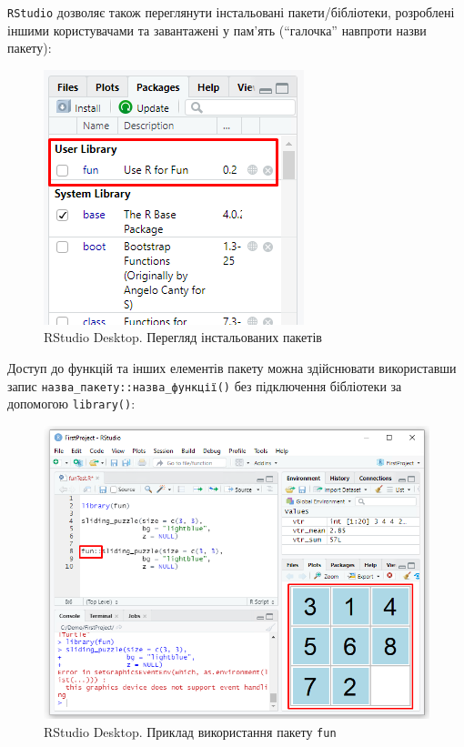 \documentclass[
]{book}
\begin{document}
\texttt{RStudio} дозволяє також переглянути інстальовані пакети/бібліотеки, розроблені іншими користувачами та завантажені у пам'ять (``галочка'' навпроти назви пакету):

\begin{figure}
\centering
\includegraphics{images/chapter1/packages_3.png}
\caption{\label{fig:unnamed-chunk-33}RStudio Desktop. Перегляд інстальованих пакетів}
\end{figure}

Доступ до функцій та інших елементів пакету можна здійснювати використавши запис \texttt{назва\_пакету::назва\_функції()} без підключення бібліотеки за допомогою \texttt{library()}:

\begin{figure}
\centering
\includegraphics{images/chapter1/packages_4.png}
\caption{\label{fig:unnamed-chunk-34}RStudio Desktop. Приклад використання пакету \texttt{fun}}
\end{figure}
\end{document}
